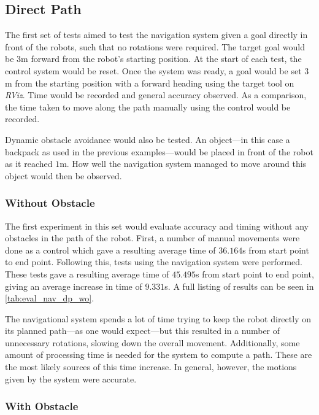 \subsection{Direct Path}

The first set of tests aimed to test the navigation system given a goal directly in front of the robots, such that no rotations were required. The target goal would be $3$m forward from the robot's starting position. At the start of each test, the control system would be reset. Once the system was ready, a goal would be set $3$m from the starting position with a forward heading using the target tool on \emph{RViz}. Time would be recorded and general accuracy observed. As a comparison, the time taken to move along the path manually using the control would be recorded. 

Dynamic obstacle avoidance would also be tested. An object---in this case a backpack as used in the previous examples---would be placed in front of the robot as it reached $1$m. How well the navigation system managed to move around this object would then be observed.

\subsubsection{Without Obstacle}

The first experiment in this set would evaluate accuracy and timing without any obstacles in the path of the robot. First, a number of manual movements were done as a control which gave a resulting average time of $36.164$s from start point to end point. Following this, tests using the navigation system were performed. These tests gave a resulting average time of $45.495$s from start point to end point, giving an average increase in time of $9.331$s. A full listing of results can be seen in \autoref{tab:eval_nav_dp_wo}.

The navigational system spends a lot of time trying to keep the robot directly on its planned path---as one would expect---but this resulted in a number of unnecessary rotations, slowing down the overall movement. Additionally, some amount of processing time is needed for the system to compute a path. These are the most likely sources of this time increase. In general, however, the motions given by the system were accurate.

\subsubsection{With Obstacle}


